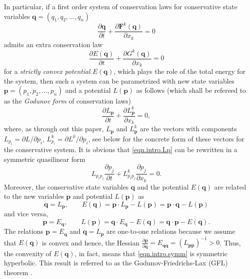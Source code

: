 \documentclass[twoside]{article}
\newcommand{\qq}{{\boldsymbol{q}}}
\newcommand{\pp}{{\boldsymbol{p}}}
\newcommand{\FF}{{\boldsymbol{F}}}
\newcommand{\pd}{\partial}
\begin{document}
In particular, if a 
first order system of conservation laws for conservative state 
variables $ \qq = (q_1,q_2,\ldots,q_n) $
\begin{equation}\label{eqn.intro.conslwas}
\frac{\pd \qq}{\pd t} + \frac{\pd \FF^k(\qq)}{\pd x_k} = 0
\end{equation}
admits an extra conservation law
\begin{equation}\label{eqn.intro.energy}
\frac{\pd E(\qq)}{\pd t} + \frac{\pd G^k(\qq)}{\pd x_k} = 0
\end{equation}
for a \textit{strictly convex potential} $ E(\qq) $, which plays the role of 
the 
total energy for the system, then such a system can be parametrized with new 
state variables $ \pp =(p_1,p_2,\ldots,p_n) $ and 
a potential $ 
L(\pp) $ as follows (which shall be refereed to as the \textit{Godunov form} of 
conservation 
laws)
\begin{equation}\label{eqn.intro.Lp}
\frac{\pd L_\pp}{\pd t} +\frac{\pd L^k_\pp}{\pd x_k}=0,
\end{equation}
where, as through out this paper, $ L_\pp $ and $ L^k_\pp $ are the vectors 
with components $ L_{p_i} = \pd L/\pd p_i$, $ L^k_{p_i} = \pd L^k/\pd 
p_i$, see below for the concrete form of these vectors for the conservative 
system. It is obvious that \eqref{eqn.intro.Lp} can be rewritten in a 
symmetric quasilinear form 
\begin{equation}\label{eqn.intro.symm}
L_{p_i p_j}\frac{\pd p_j}{\pd t} + L^k_{p_i p_j}\frac{\pd p_j}{\pd x_k} = 0.
\end{equation}
Moreover, the conservative state variables $ \qq $ and the potential $ E(\qq) $ 
are related to the new variables $ \pp $ and potential $ L(\pp) $ as
\begin{equation}\label{eqn.intro.qprelations}
\qq = L_\pp, \qquad E(\qq) = \pp\cdot L_\pp - L(\pp) = \pp\cdot\qq - L(\pp)
\end{equation}
and vice versa,
\begin{equation}\label{eqn.intro.pqrelations}
\pp = E_\qq, \qquad L(\pp) = \qq\cdot E_\qq - E(\qq) = \qq\cdot\pp - E(\qq).
\end{equation}
The relations $ \pp = E_\qq $ and $ \qq = L_\pp $ are one-to-one relations 
because we assume that $ E(\qq) $ is convex and hence, the Hessian $ 
\frac{\pd\pp}{\pd \qq} = E_{\qq\qq} = (L_{\pp\pp})^{-1} > 0$. Thus, the 
convexity of $ E(\qq) $, in fact, means that \eqref{eqn.intro.symm} is 
symmetric hyperbolic. This result is referred to as the Godunov-Friedrichs-Lax (GFL) 
theorem \cite{Gavrilyuk}.
\end{document}
